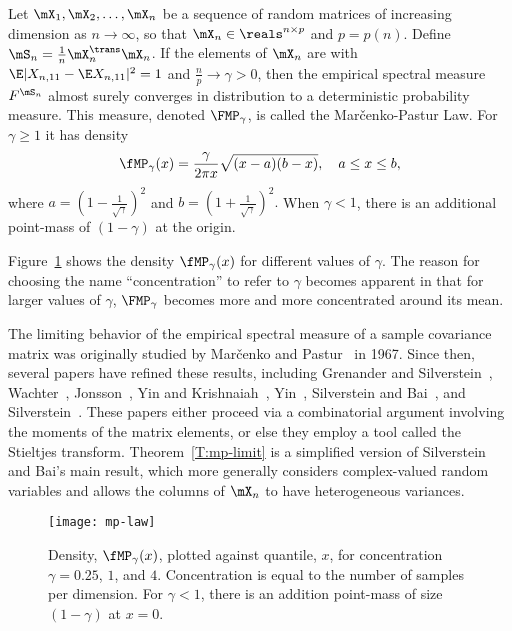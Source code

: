 \begin{theorem}\label{T:mp-limit}
Let $\mX_1, \mX_2, \ldots, \mX_n$ be a sequence of random matrices of increasing dimension as $n \to \infty$, so that $\mX_n \in \reals^{n\times p}$ and $p = p(n)$.
Define $\mS_n = \frac{1}{n} \mX_n^\trans \mX_n$.  If the elements of $\mX_n$ are \iid with $\E| X_{n,11} - \E X_{n,11} |^2 = 1$ and $\frac{n}{p} \to \gamma > 0$, then the empirical spectral measure $F^{\mS_n}$ almost surely converges in distribution to a deterministic probability measure.  This measure, denoted
$\FMP_\gamma$, is called the Mar\v{c}enko-Pastur Law.  For $\gamma \geq 1$ it
has density
\begin{equation}
    \fMP_\gamma(x)
    =
    \frac{\gamma}{2 \pi x}
    \sqrt{(x - a)(b - x)},
    \quad
    a \leq x \leq b,
\end{equation}
where
\(
    a = \left( 1 - \frac{1}{\sqrt{\gamma}} \right)^2
\)
and
\(
    b = \left( 1 + \frac{1}{\sqrt{\gamma}} \right)^2.
\)
When $\gamma < 1$, there is an additional point-mass of $(1 - \gamma)$ at the origin.
\end{theorem}

\noindent
Figure~\ref{F:mp-law} shows the density $\fMP_\gamma(x)$ for different values
of $\gamma$.  The reason for choosing the name ``concentration'' to refer to $\gamma$ becomes apparent in that for larger values of $\gamma$, $\FMP_\gamma$ becomes more and more concentrated around its mean.

The limiting behavior of the empirical spectral measure of a sample covariance matrix was originally studied by Mar\v{c}enko and Pastur~\cite{marcenko1967des} in 1967.  Since then, several papers have refined these results, including Grenander and Silverstein~\cite{grenander1977san}, Wachter~\cite{wachter1978slr},
 Jonsson~\cite{jonsson1982slt}, Yin and Krishnaiah~\cite{yin1983lte},
Yin~\cite{yin1986lsd}, Silverstein and Bai~\cite{silverstein1995ede}, and
Silverstein~\cite{silverstein1995sce}.  These papers either proceed via a combinatorial argument involving the moments of the matrix elements, or else they employ a tool called the Stieltjes transform.  Theorem~\ref{T:mp-limit} is a simplified version of Silverstein and Bai's main result, which more generally considers complex-valued random variables and allows the columns of $\mX_n$ to have heterogeneous variances.

\begin{figure}
    \centering
    \texttt{[image: mp-law]}
    \caption{
        Density, $\fMP_\gamma(x)$, plotted against quantile, $x$,
        for concentration $\gamma = 0.25$, $1$, and $4$.  Concentration
        is equal to the number of samples per dimension. For $\gamma < 1$,
        there is an addition point-mass of size $(1 - \gamma)$ at $x = 0$.
    }\label{F:mp-law}
\end{figure}

